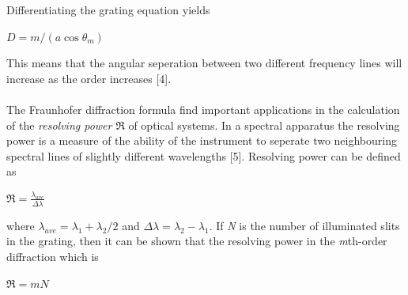 \documentclass[a4paper,12pt]{report}
\begin{document}
Differentiating the grating equation yields
\begin{center}
	$D=m/(a\cos\theta_{m})$
\end{center}
This means that the angular seperation between two different frequency lines will increase as the order increases [4].\\\\
The Fraunhofer diffraction formula find important applications in the calculation of the \textit{resolving power} $\Re$ of optical systems. In a spectral apparatus the resolving power is a measure of the ability of the instrument to seperate two neighbouring spectral lines of slightly different wavelengths [5]. Resolving power can be defined as 
\begin{center}
{\Large 	$\Re=\frac{\lambda_{ave}}{\Delta\lambda}$  }
\end{center}
where $\lambda_{ave}=\lambda_{1}+\lambda_{2}/2$ and $\Delta\lambda=\lambda_{2}-\lambda_{1}$. If \textit{N} is the number of illuminated slits in the grating, then it can be shown that the
resolving power in the \textit{m}th-order diffraction which is 
\begin{center}
{\Large 	$\Re=mN$}
\end{center}
\end{document}

